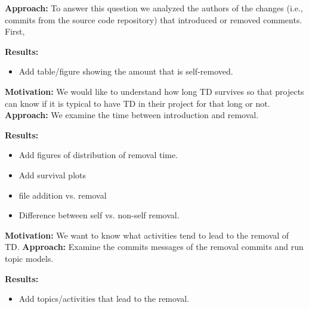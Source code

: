 \vspace{1mm}
\noindent \textbf{Approach:} To answer this question we analyzed the authors of the changes (i.e., commits from the source code repository) that introduced or removed \SATD comments. First, 

\vspace{1mm}
\noindent \textbf{Results:} 
\begin{itemize}
\item Add table/figure showing the amount that is self-removed.
\end{itemize}



\vspace{3mm}
\noindent\rqiii
\vspace{3mm}

\noindent \textbf{Motivation:} 
We would like to understand how long TD survives so that projects can know if it is typical to have TD in their project for that long or not.
\vspace{1mm}
\noindent \textbf{Approach:} 
We examine the time between introduction and removal.

\vspace{1mm}
\noindent \textbf{Results:} 
\begin{itemize}
\item Add figures of distribution of removal time.
\item Add survival plots
\item file addition vs. removal
\item Difference between self vs. non-self removal.
\end{itemize}


 \vspace{3mm}
 \noindent\rqiv
 \vspace{3mm}

 \noindent \textbf{Motivation:} 
We want to know what activities tend to lead to the removal of TD.
 \vspace{1mm}
 \noindent \textbf{Approach:} 
Examine the commits messages of the removal commits and run topic models.
 \vspace{1mm}
 
 \noindent \textbf{Results:} 
\begin{itemize}
\item Add topics/activities that lead to the removal.
\end{itemize}
 \conclusionbox{}